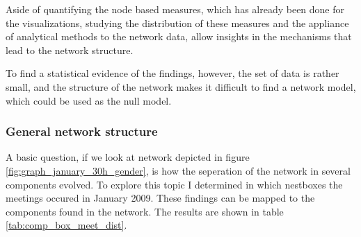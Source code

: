 Aside of quantifying the node based measures, which has already been done for the visualizations, studying the distribution of these measures and the appliance of analytical methods to the network data, allow insights in the mechanisms that lead to the network structure.  

To find a statistical evidence of the findings, however, the set of data is rather small, and the structure of the network makes it difficult to find a network model, which could be used as the null model. 

\subsubsection{General network structure}
\label{subsubsec:general_structure}

A basic question, if we look at network depicted in figure \ref{fig:graph_january_30h_gender}, is how the seperation of the network in several components evolved. To explore this topic I determined in which nestboxes the meetings occured in January 2009. These findings can be mapped to the components found in the network. The results are shown in table \ref{tab:comp_box_meet_dist}.


